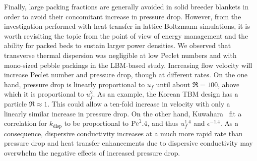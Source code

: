 Finally, large packing fractions are generally avoided in solid breeder blankets in order to avoid their concomitant increase in pressure drop. However, from the investigation performed with heat transfer in lattice-Boltzmann simulations, it is worth revisiting the topic from the point of view of energy management and the ability for packed beds to sustain larger power densities. We observed that transverse thermal dispersion was negligible at low Peclet numbers and with mono-sized pebble packings in the LBM-based study. Increasing flow velocity will increase Peclet number and pressure drop, though at different rates. On the one hand, pressure drop is linearly proportional to $u_f$ until about $\Re = 100$, above which it is proportional to $u_f^2$. As an example, the Korean TBM design has a particle $\Re \approx 1$. This could allow a ten-fold increase in velocity with only a linearly similar increase in pressure drop. On the other hand, Kuwahara \etal~fit a correlation for $k_\text{disp}$ to be proportional to $\mathrm{Pe}^1.4$, and thus $u_f^{1.4}$ and $\epsilon^{-1.4}$. As a consequence, dispersive conductivity increases at a much more rapid rate than pressure drop and heat transfer enhancements due to dispersive conductivity may overwhelm the negative effects of increased pressure drop.
